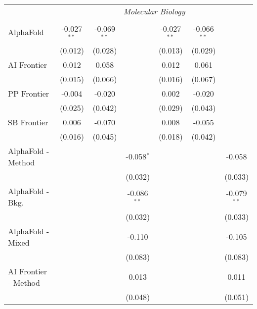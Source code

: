 \begin{tabular}{lcccccc}
 & \multicolumn{6}{c}{\textit{Molecular Biology}} \\ \\
   AlphaFold            & -0.027$^{**}$ & -0.069$^{**}$ &               & -0.027$^{**}$ & -0.066$^{**}$ &   \\   
                        & (0.012)       & (0.028)       &               & (0.013)       & (0.029)       &   \\   
   AI Frontier          & 0.012         & 0.058         &               & 0.012         & 0.061         &   \\   
                        & (0.015)       & (0.066)       &               & (0.016)       & (0.067)       &   \\   
   PP Frontier          & -0.004        & -0.020        &               & 0.002         & -0.020        &   \\   
                        & (0.025)       & (0.042)       &               & (0.029)       & (0.043)       &   \\   
   SB Frontier          & 0.006         & -0.070        &               & 0.008         & -0.055        &   \\   
                        & (0.016)       & (0.045)       &               & (0.018)       & (0.042)       &   \\   
   AlphaFold - Method   &               &               & -0.058$^{*}$  &               &               & -0.058\\   
                        &               &               & (0.032)       &               &               & (0.033)\\   
   AlphaFold - Bkg.     &               &               & -0.086$^{**}$ &               &               & -0.079$^{**}$\\   
                        &               &               & (0.032)       &               &               & (0.033)\\   
   AlphaFold - Mixed    &               &               & -0.110        &               &               & -0.105\\   
                        &               &               & (0.083)       &               &               & (0.083)\\   
   AI Frontier - Method &               &               & 0.013         &               &               & 0.011\\   
                        &               &               & (0.048)       &               &               & (0.051)\\   

\end{tabular}
